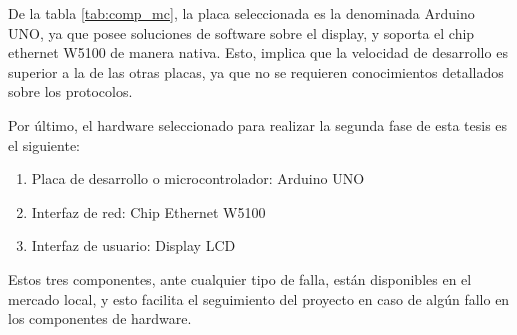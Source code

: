 \renewcommand{\arraystretch}{1.2}
\begin{table}[ht]
\caption{Cuadro comparativo de placas disponibles en el Instituto Argentino de radioastronomía}
\label{tab:comp_mc}
\end{table} 





De la tabla \ref{tab:comp_mc}, la placa seleccionada es la denominada Arduino UNO, ya que posee soluciones de software sobre el display, y soporta el chip ethernet W5100 de manera nativa. Esto, implica que la velocidad de desarrollo es superior a la de las otras placas, ya que no se requieren conocimientos detallados sobre los protocolos. 

Por último, el hardware seleccionado para realizar la segunda fase de esta tesis es el siguiente: 
\begin{enumerate}
	\item Placa de desarrollo o microcontrolador: Arduino UNO 
	\item Interfaz de red: Chip Ethernet W5100 
	\item Interfaz de usuario: Display LCD  
\end{enumerate}

Estos tres componentes, ante cualquier tipo de falla, están disponibles en el mercado local, y esto facilita el seguimiento del proyecto en caso de algún fallo en los componentes de hardware. 


